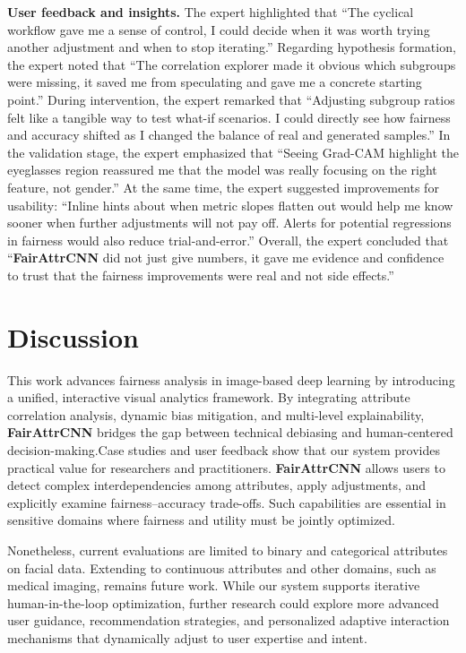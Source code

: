 \documentclass[sigconf]{acmart}
\newcommand{\REVISE}[1]{#1}
\begin{document}
\REVISE{
\textbf{User feedback and insights.}  
The expert highlighted that ``The cyclical workflow gave me a sense of control, I could decide when it was worth trying another adjustment and when to stop iterating.'' Regarding hypothesis formation, the expert noted that ``The correlation explorer made it obvious which subgroups were missing, it saved me from speculating and gave me a concrete starting point.'' During intervention, the expert remarked that ``Adjusting subgroup ratios felt like a tangible way to test what-if scenarios. I could directly see how fairness and accuracy shifted as I changed the balance of real and generated samples.'' In the validation stage, the expert emphasized that ``Seeing Grad-CAM highlight the eyeglasses region reassured me that the model was really focusing on the right feature, not gender.'' At the same time, the expert suggested improvements for usability: ``Inline hints about when metric slopes flatten out would help me know sooner when further adjustments will not pay off. Alerts for potential regressions in fairness would also reduce trial-and-error.'' Overall, the expert concluded that ``\textbf{FairAttrCNN} did not just give numbers, it gave me evidence and confidence to trust that the fairness improvements were real and not side effects.''}

\section{Discussion}


This work advances fairness analysis in image-based deep learning by introducing a unified, interactive visual analytics framework. By integrating attribute correlation analysis, dynamic bias mitigation, and multi-level explainability, \textbf{FairAttrCNN} bridges the gap between technical debiasing and human-centered decision-making.Case studies and user feedback show that our system provides practical value for researchers and practitioners. \textbf{FairAttrCNN} allows users to detect complex interdependencies among attributes, apply adjustments, and explicitly examine fairness–accuracy trade-offs. Such capabilities are essential in sensitive domains where fairness and utility must be jointly optimized.

\REVISE{Nonetheless, current evaluations are limited to binary and categorical attributes on facial data. Extending to continuous attributes and other domains, such as medical imaging, remains future work. While our system supports iterative human-in-the-loop optimization, further research could explore more advanced user guidance, recommendation strategies, and personalized adaptive interaction mechanisms that dynamically adjust to user expertise and intent.}
\end{document}
